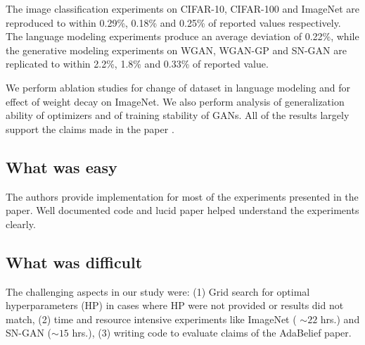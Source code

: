 							
The image classification experiments on CIFAR-10, CIFAR-100 and ImageNet are reproduced to within 0.29\%, 0.18\% and 0.25\% of reported values respectively. The language modeling experiments produce an average deviation of 0.22\%, while the generative modeling experiments on WGAN, WGAN-GP and SN-GAN are replicated to within 2.2\%, 1.8\% and 0.33\% of reported value.
\par
We perform ablation studies for change of dataset in language modeling and for effect of weight decay on ImageNet. We also perform analysis of generalization ability of optimizers and of training stability of GANs. All of the results largely support the claims made in the paper \cite{zhuang_adabelief_2020}.



\subsection*{What was easy}

The  authors  provide  implementation  for  most  of  the  experiments  presented  in  the  paper.   Well documented code and lucid paper helped understand the experiments clearly.

\subsection*{What was difficult}

The challenging aspects in our study were: (1) Grid search for optimal hyperparameters (HP) in cases where HP were not provided or results did not match, (2) time and resource intensive experiments like ImageNet ( $\sim22$ hrs.) and SN-GAN ($\sim15$ hrs.), (3) writing code to evaluate claims of the AdaBelief paper.


